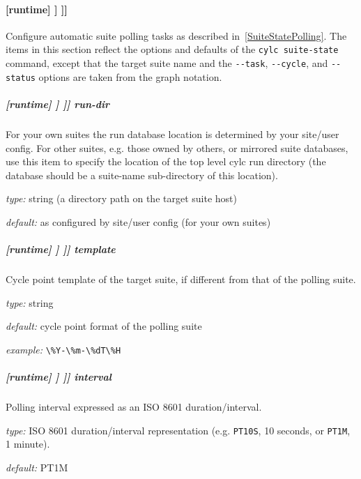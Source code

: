 \paragraph[{[[[}suite state polling{]]]}]{[runtime] \textrightarrow [[\_\_NAME\_\_]] \textrightarrow [[[suite state polling]]]}

\lstset{language=transcript}
Configure automatic suite polling tasks as described
in~\ref{SuiteStatePolling}. The
items in this section reflect the options and defaults of the
\lstinline=cylc suite-state= command, except that the target suite name and the
\lstinline=--task=, \lstinline=--cycle=, and \lstinline=--status= options are
taken from the graph notation.

\subparagraph[run-dir]{[runtime] \textrightarrow [[\_\_NAME\_\_]] \textrightarrow [[[suite state polling]]] \textrightarrow run-dir}

For your own suites the run database location is determined by your
site/user config. For other suites, e.g. those owned by others, or
mirrored suite databases, use this item to specify the location
of the top level cylc run directory (the database should be a
suite-name sub-directory of this location).

\begin{myitemize}
    \item {\em type:} string (a directory path on the target suite host)
    \item {\em default:} as configured by site/user config (for your own suites)
\end{myitemize}

\subparagraph[template]{[runtime] \textrightarrow [[\_\_NAME\_\_]] \textrightarrow [[[suite state polling]]] \textrightarrow template}

Cycle point template of the target suite, if different from that of the polling suite.

\begin{myitemize}
    \item {\em type:} string
    \item {\em default:} cycle point format of the polling suite
    \item {\em example:} \lstinline=\%Y-\%m-\%dT\%H=
\end{myitemize}

\subparagraph[interval]{[runtime] \textrightarrow [[\_\_NAME\_\_]] \textrightarrow [[[suite state polling]]] \textrightarrow interval}

Polling interval expressed as an ISO 8601 duration/interval.
\begin{myitemize}
    \item {\em type:} ISO 8601 duration/interval representation (e.g.
 \lstinline=PT10S=, 10 seconds, or \lstinline=PT1M=, 1 minute).
    \item {\em default:} PT1M
\end{myitemize}

